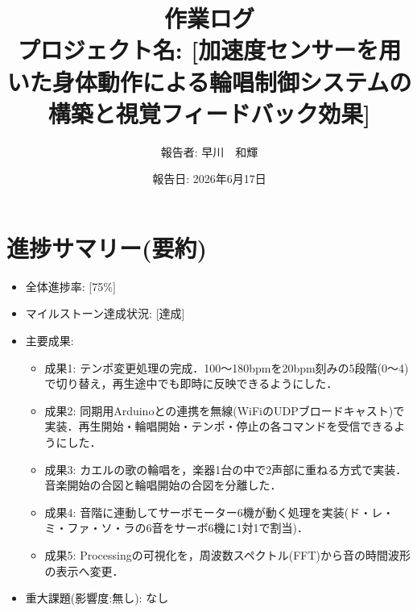 \documentclass[uplatex,dvipdfmx]{jlreq}
\title{作業ログ\\ \large プロジェクト名: [加速度センサーを用いた身体動作による輪唱制御システムの構築と視覚フィードバック効果]}
\author{報告者: 早川　和輝}
\date{報告日: 2026年6月17日}
\begin{document}
\maketitle

\section{進捗サマリー(要約)}
\begin{itemize}
    \item 全体進捗率: [75\%]
    \item マイルストーン達成状況: [達成]
    \item 主要成果:
    \begin{itemize}
        \item 成果1: テンポ変更処理の完成．100〜180bpmを20bpm刻みの5段階(0〜4)で切り替え，再生途中でも即時に反映できるようにした．
        \item 成果2: 同期用Arduinoとの連携を無線(WiFiのUDPブロードキャスト)で実装．再生開始・輪唱開始・テンポ・停止の各コマンドを受信できるようにした．
        \item 成果3: カエルの歌の輪唱を，楽器1台の中で2声部に重ねる方式で実装．音楽開始の合図と輪唱開始の合図を分離した．
        \item 成果4: 音階に連動してサーボモーター6機が動く処理を実装(ド・レ・ミ・ファ・ソ・ラの6音をサーボ6機に1対1で割当)．
        \item 成果5: Processingの可視化を，周波数スペクトル(FFT)から音の時間波形の表示へ変更．
    \end{itemize}
    \item 重大課題(影響度:無し): なし
\end{itemize}
\end{document}

